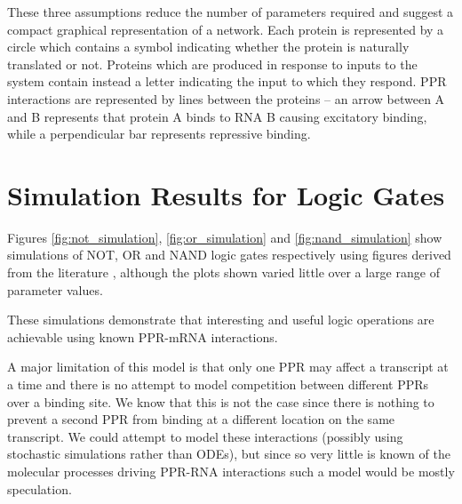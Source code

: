 These three assumptions reduce the number of parameters required and suggest a
compact graphical representation of a network.
Each protein is represented by a circle which contains a symbol indicating
whether the protein is naturally translated or not.
Proteins which are produced in response to inputs to the system contain instead 
a letter indicating the input to which they respond.
PPR interactions are represented by lines between the proteins -- an arrow
between A and B represents that protein A binds to RNA B causing excitatory
binding, while a perpendicular bar represents repressive binding.

\section{Simulation Results for Logic Gates}
\label{sec:sim_logic}

Figures \ref{fig:not_simulation}, \ref{fig:or_simulation} and
\ref{fig:nand_simulation} show simulations of NOT, OR and NAND logic gates
respectively using figures derived from the literature  
\citep[see][]{So2011,Andersen1998}, 
although the plots shown varied little over a large range of parameter values.

These simulations demonstrate that interesting and useful logic operations are
achievable using known PPR-mRNA interactions.

A major limitation of this model is that only one PPR may affect a transcript
at a time and there is no attempt to model competition between different PPRs 
over a binding site.
We know that this is not the case since there is nothing to prevent a second
PPR from binding at a different location on the same transcript.
We could attempt to model these interactions (possibly using stochastic
simulations rather than ODEs), but since so very little is known of the 
molecular processes driving PPR-RNA interactions such a model would be mostly
speculation.

